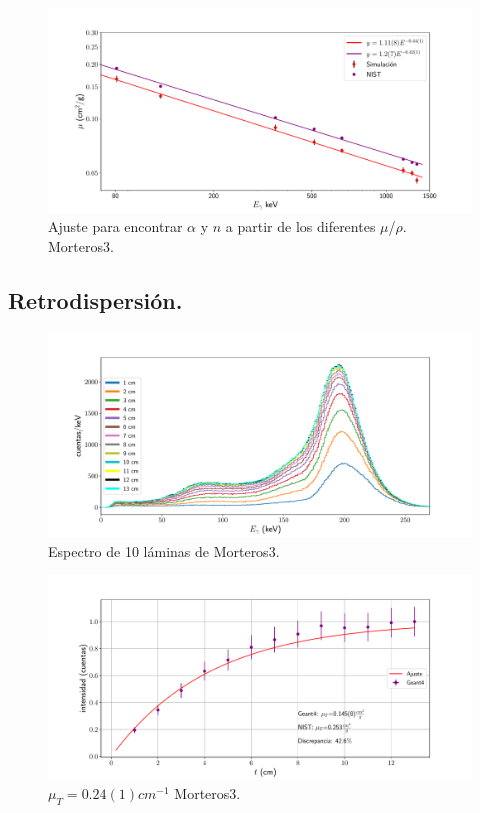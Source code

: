 \begin{figure}[H]
	\centering
	\includegraphics[width=1.0\linewidth]{Kap4/mu-trans-m3.pdf}
	\caption{Ajuste para encontrar $\alpha$ y $n$ a partir de los diferentes $\mu$/$\rho$. Morteros3.}
	\label{fig:mu-trans-m3}
\end{figure}
 
 
 \subsection{Retrodispersión.}
 
\begin{figure}[H]
	\centering
	\includegraphics[width=1.0\linewidth]{Kap4/espectro_m3.pdf}
	\caption{Espectro de 10 láminas de Morteros3.}
	\label{fig:espectrom3}
\end{figure}

\begin{figure}[H]
	\centering
	\includegraphics[width=1.0\linewidth]{Kap4/mu_T-m3.pdf}
	\caption{$\mu_T=0.24(1) cm^{-1}$ Morteros3.}
	\label{fig:mut-m3}
\end{figure}


